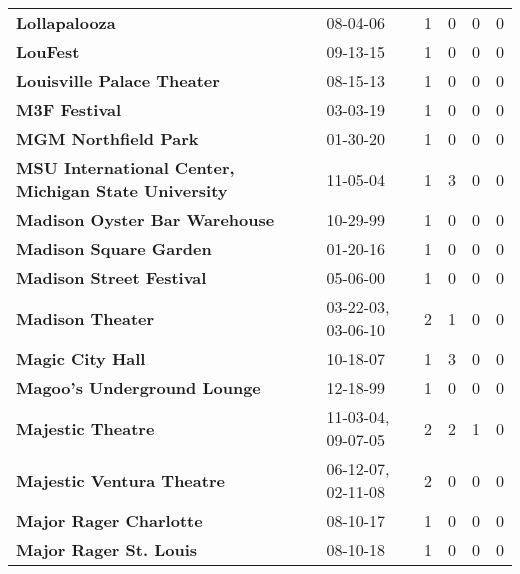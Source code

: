\begin{supertabular}{llllll}
                                                \textbf{Lollapalooza} &                      08-04-06 &  1 &   0 &  0 &  0 \\
                                                     \textbf{LouFest} &                      09-13-15 &  1 &   0 &  0 &  0 \\
                                   \textbf{Louisville Palace Theater} &                      08-15-13 &  1 &   0 &  0 &  0 \\
                                                \textbf{M3F Festival} &                      03-03-19 &  1 &   0 &  0 &  0 \\
                                         \textbf{MGM Northfield Park} &                      01-30-20 &  1 &   0 &  0 &  0 \\
         \textbf{MSU International Center, Michigan State University} &                      11-05-04 &  1 &   3 &  0 &  0 \\
                                \textbf{Madison Oyster Bar Warehouse} &                      10-29-99 &  1 &   0 &  0 &  0 \\
                                       \textbf{Madison Square Garden} &                      01-20-16 &  1 &   0 &  0 &  0 \\
                                     \textbf{Madison Street Festival} &                      05-06-00 &  1 &   0 &  0 &  0 \\
                                             \textbf{Madison Theater} &            03-22-03, 03-06-10 &  2 &   1 &  0 &  0 \\
                                             \textbf{Magic City Hall} &                      10-18-07 &  1 &   3 &  0 &  0 \\
                                  \textbf{Magoo's Underground Lounge} &                      12-18-99 &  1 &   0 &  0 &  0 \\
                                            \textbf{Majestic Theatre} &            11-03-04, 09-07-05 &  2 &   2 &  1 &  0 \\
                                    \textbf{Majestic Ventura Theatre} &            06-12-07, 02-11-08 &  2 &   0 &  0 &  0 \\
                                       \textbf{Major Rager Charlotte} &                      08-10-17 &  1 &   0 &  0 &  0 \\
                                       \textbf{Major Rager St. Louis} &                      08-10-18 &  1 &   0 &  0 &  0 \\

\end{supertabular}
